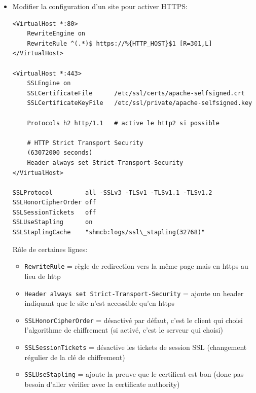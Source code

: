 \documentclass[a4paper]{article}
\begin{document}
\begin{itemize}
\item Modifier la configuration d'un site pour activer HTTPS:
\begin{example} \begin{verbatim}
<VirtualHost *:80>
    RewriteEngine on
    RewriteRule ^(.*)$ https://%{HTTP_HOST}$1 [R=301,L]
</VirtualHost>

<VirtualHost *:443>
    SSLEngine on
    SSLCertificateFile      /etc/ssl/certs/apache-selfsigned.crt
    SSLCertificateKeyFile   /etc/ssl/private/apache-selfsigned.key

    Protocols h2 http/1.1   # active le http2 si possible

    # HTTP Strict Transport Security
    (63072000 seconds)
    Header always set Strict-Transport-Security
</VirtualHost>

SSLProtocol         all -SSLv3 -TLSv1 -TLSv1.1 -TLSv1.2
SSLHonorCipherOrder off
SSLSessionTickets   off
SSLUseStapling      on
SSLStaplingCache    "shmcb:logs/ssl\_stapling(32768)"
\end{verbatim} \end{example}
Rôle de certaines lignes:
\begin{example} \begin{itemize}
    \item \texttt{RewriteRule} = règle de redirection vers la même page mais en https au lieu de http
    \item \texttt{Header always set Strict-Transport-Security} = ajoute un header indiquant que le site n'est accessible qu'en https
    \item \texttt{SSLHonorCipherOrder} = désactivé par défaut, c'est le client qui choisi l'algorithme de chiffrement (si activé, c'est le serveur qui choisi)
    \item \texttt{SSLSessionTickets} = désactive les tickets de session SSL (changement régulier de la clé de chiffrement)
    \item \texttt{SSLUseStapling} = ajoute la preuve que le certificat est bon (donc pas besoin d'aller vérifier avec la certificate authority)
\end{itemize} \end{example}


\end{itemize}
\end{document}

